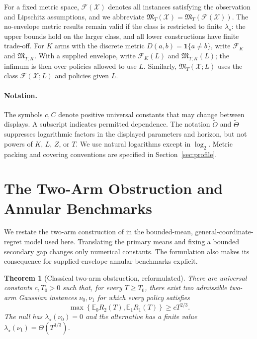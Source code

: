 \documentclass[11pt]{article}
\newtheorem{theorem}{Theorem}[section]
\theoremstyle{definition}
\newcommand{\X}{\mathcal X}
\newcommand{\F}{\mathcal F}
\newcommand{\E}{\mathbb E}
\newcommand{\ind}{\mathbf 1}
\begin{document}
For a fixed metric space, $\F(\X)$ denotes all instances satisfying
the observation and Lipschitz assumptions, and we abbreviate
$\mathfrak M_T(\X)=\mathfrak M_T(\F(\X))$. The no-envelope metric
results remain valid if the class is restricted to finite
$\lambda_\star$: the upper bounds hold on the larger class, and all
lower constructions have finite trade-off.
For $K$ arms with the discrete metric $D(a,b)=\ind\{a\ne b\}$, write
$\F_K$ and $\mathfrak M_{T,K}$. With a supplied envelope, write
$\F_K(L)$ and $\mathfrak M_{T,K}(L)$; the infimum is then over policies
allowed to use $L$. Similarly, $\mathfrak M_T(\X;L)$ uses the class
$\F(\X;L)$ and policies given $L$.

\paragraph{Notation.}
The symbols $c,C$ denote positive universal constants that may change
between displays. A subscript indicates permitted dependence.
The notation $\widetilde O$ and $\widetilde\Theta$ suppresses
logarithmic factors in the displayed parameters and horizon, but not
powers of $K$, $L$, $Z$, or $T$. We use natural logarithms except in
$\log_2$. Metric packing and covering conventions are specified in
Section~\ref{sec:profile}.

\section{The Two-Arm Obstruction and Annular Benchmarks}
\label{sec:two-arm}

We restate the two-arm construction of \citet[Theorem~2]{huyuk2021lexicographic}
in the bounded-mean, general-coordinate-regret model used here. Translating
the primary means and fixing a bounded secondary gap changes only numerical
constants. The formulation also makes its consequence for supplied-envelope
annular benchmarks explicit.

\begin{theorem}[Classical two-arm obstruction, reformulated]
\label{thm:two-arm-lower}
There are universal constants $c,T_0>0$ such that, for every $T\ge T_0$, there exist two admissible two-arm Gaussian instances $\nu_0,\nu_1$ for which every policy satisfies
\[
  \max\left\{\E_0R_2(T),\E_1R_1(T)\right\}
  \ge cT^{2/3}.
\]
The null has $\lambda_\star(\nu_0)=0$ and the alternative has a finite value $\lambda_\star(\nu_1)=\Theta(T^{1/3})$.
\end{theorem}
\end{document}
